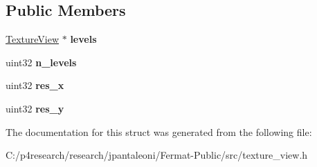 \subsection*{Public Members}
\begin{DoxyCompactItemize}
\item 
\mbox{\label{struct_mip_map_view_a1ac82eab4672308c4b2f533cc555886b}} 
\hyperlink{struct_texture_view}{Texture\+View} $\ast$ {\bfseries levels}
\item 
\mbox{\label{struct_mip_map_view_aee5c825d5aec33b1cd427425a05898f6}} 
uint32 {\bfseries n\+\_\+levels}
\item 
\mbox{\label{struct_mip_map_view_ac84eb566cbae4b46b39a3526c83bf9b5}} 
uint32 {\bfseries res\+\_\+x}
\item 
\mbox{\label{struct_mip_map_view_a3bffda62e9ace1c719fd101efb465243}} 
uint32 {\bfseries res\+\_\+y}
\end{DoxyCompactItemize}


The documentation for this struct was generated from the following file\+:\begin{DoxyCompactItemize}
\item 
C\+:/p4research/research/jpantaleoni/\+Fermat-\/\+Public/src/texture\+\_\+view.\+h\end{DoxyCompactItemize}
